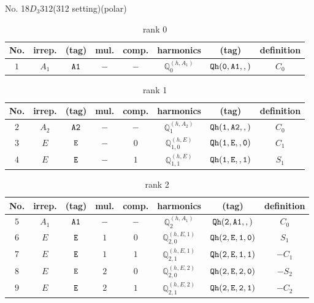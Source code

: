 \documentclass[fleqn,8pt]{jsarticle}
\begin{document}
\setcounter{MaxMatrixCols}{16}

\begin{center}
\LARGE
No. 18\quad$D_{3}$\quad$312$\quad(312 setting)\quad[ trigonal ] (polar)
\end{center}
\begin{table}[ht!]
\begin{center}
\caption{rank 0}
\renewcommand{\arraystretch}{1.3}
\begin{tabular}{cccccccc} \hline \hline
No. & irrep. & (tag) & mul. & comp. & harmonics & (tag) & definition \\ \hline
$ 1 $ & $ A_{1} $ & $ {\tt A1} $ & $ - $ & $ - $ & $ \mathbb{Q}_{0}^{(h,A_{1})} $ & $ {\tt Qh(0,A1,,)} $ & $ C_{0} $ \\
 \hline \hline
\end{tabular}
\end{center}
\end{table}
\begin{table}[ht!]
\begin{center}
\caption{rank 1}
\renewcommand{\arraystretch}{1.3}
\begin{tabular}{cccccccc} \hline \hline
No. & irrep. & (tag) & mul. & comp. & harmonics & (tag) & definition \\ \hline
$ 2 $ & $ A_{2} $ & $ {\tt A2} $ & $ - $ & $ - $ & $ \mathbb{Q}_{1}^{(h,A_{2})} $ & $ {\tt Qh(1,A2,,)} $ & $ C_{0} $ \\
$ 3 $ & $ E $ & $ {\tt E} $ & $ - $ & $ 0 $ & $ \mathbb{Q}_{1,0}^{(h,E)} $ & $ {\tt Qh(1,E,,0)} $ & $ C_{1} $ \\
$ 4 $ & $ E $ & $ {\tt E} $ & $ - $ & $ 1 $ & $ \mathbb{Q}_{1,1}^{(h,E)} $ & $ {\tt Qh(1,E,,1)} $ & $ S_{1} $ \\
 \hline \hline
\end{tabular}
\end{center}
\end{table}
\begin{table}[ht!]
\begin{center}
\caption{rank 2}
\renewcommand{\arraystretch}{1.3}
\begin{tabular}{cccccccc} \hline \hline
No. & irrep. & (tag) & mul. & comp. & harmonics & (tag) & definition \\ \hline
$ 5 $ & $ A_{1} $ & $ {\tt A1} $ & $ - $ & $ - $ & $ \mathbb{Q}_{2}^{(h,A_{1})} $ & $ {\tt Qh(2,A1,,)} $ & $ C_{0} $ \\
$ 6 $ & $ E $ & $ {\tt E} $ & $ 1 $ & $ 0 $ & $ \mathbb{Q}_{2,0}^{(h,E,1)} $ & $ {\tt Qh(2,E,1,0)} $ & $ S_{1} $ \\
$ 7 $ & $ E $ & $ {\tt E} $ & $ 1 $ & $ 1 $ & $ \mathbb{Q}_{2,1}^{(h,E,1)} $ & $ {\tt Qh(2,E,1,1)} $ & $ - C_{1} $ \\
$ 8 $ & $ E $ & $ {\tt E} $ & $ 2 $ & $ 0 $ & $ \mathbb{Q}_{2,0}^{(h,E,2)} $ & $ {\tt Qh(2,E,2,0)} $ & $ - S_{2} $ \\
$ 9 $ & $ E $ & $ {\tt E} $ & $ 2 $ & $ 1 $ & $ \mathbb{Q}_{2,1}^{(h,E,2)} $ & $ {\tt Qh(2,E,2,1)} $ & $ - C_{2} $ \\
 \hline \hline
\end{tabular}
\end{center}
\end{table}
\end{document}
